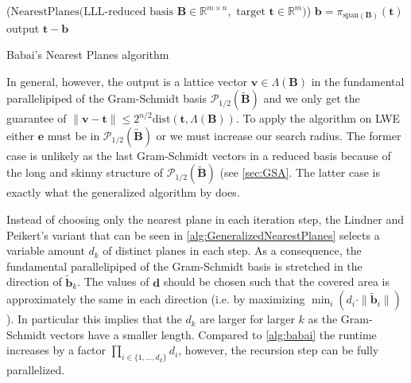 \begin{algorithm2e}
  \Begin($\text{NearestPlanes} {(}\text{LLL-reduced basis }\mathbf{B} \in \mathbb{R}^{m \times n},\text{ target }\mathbf{t}\in \mathbb{R}^{m}{)}$)
  {
    $\mathbf{b} = \pi_{\text{span}(\mathbf{B})}(\mathbf{t})$\\
    output $\mathbf{t} - \mathbf{b}$\\
  }
  \caption{Babai's Nearest Planes algorithm \cite{Bab85}}\label{alg:babai} %
\end{algorithm2e}

In general, however, the output is a lattice vector $\mathbf{v} \in \Lambda(\mathbf{B})$ in the fundamental parallelipiped of the Gram-Schmidt basis $\mathcal{P}_{1/2}(\tilde{\mathbf{B}})$ and we only get the guarantee of $\|\mathbf{v} - \mathbf{t}\| \leq 2^{n/2} \text{dist}(\mathbf{t}, \Lambda(\mathbf{B}))$. To apply the algorithm on LWE either $\mathbf{e}$ must be in $\mathcal{P}_{1/2}(\tilde{\mathbf{B}})$ or we must increase our search radius. The former case is unlikely as the last Gram-Schmidt vectors in a reduced basis because of the long and skinny structure of $\mathcal{P}_{1/2}(\tilde{\mathbf{B}})$ (see \cref{sec:GSA}. The latter case is exactly what the generalized algorithm by \cite{LP11} does.

Instead of choosing only the nearest plane in each iteration step, the Lindner and Peikert's variant that can be seen in \cref{alg:GeneralizedNearestPlanes} selects a variable amount $d_k$ of distinct planes in each step. As a consequence, the fundamental parallelipiped of the Gram-Schmidt basis is stretched in the direction of $\tilde{\mathbf{b}}_k$. The values of $\mathbf{d}$ should be chosen such that the covered area is approximately the same in each direction (i.e. by maximizing $\min_i(d_i \cdot \|\tilde{\mathbf{b}}_i\|)$). In particular this implies that the $d_k$ are larger for larger $k$ as the Gram-Schmidt vectors have a smaller length. %
Compared to \cref{alg:babai} the runtime increases by a factor $\prod_{i \in \{1, \dots, d_k\}} d_i$, however, the recursion step can be fully parallelized.

